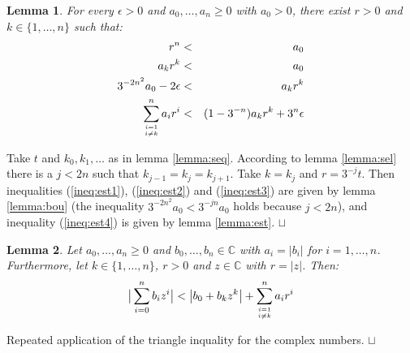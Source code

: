\documentclass{article}
\def\CC{\mathbb{C}}
\newtheorem{lemma}{Lemma}
\newenvironment{proof}{\trivlist \item[\hskip \labelsep{\bf Proof$\,$}]}{\hfill\rlap{$\sqcap$}$\sqcup$\par}
\begin{document}
\begin{lemma}\label{lemma:est1}
For every $\epsilon > 0$ and $a_0,\ldots,a_n \ge 0$ with $a_0 > 0$, there
exist $r > 0$ and $k\in\{1,\ldots,n\}$ such that:
\begin{eqnarray}
r^n &<& a_0 \label{ineq:est1}\\
a_k r^k &<& a_0 \label{ineq:est2}\\
3^{-2n^2} a_0 - 2\epsilon &<& a_k r^k \label{ineq:est3}\\
\sum_{i=1\atop i\ne k}^n a_i r^i &<& (1 - 3^{-n}) a_k r^k + 3^n\epsilon \label{ineq:est4}
\end{eqnarray}
\end{lemma}
\begin{proof}
Take $t$ and $k_0, k_1, \ldots$ as in lemma \ref{lemma:seq}.  According to
lemma \ref{lemma:sel} there is a $j < 2n$ such that $k_{j-1} = k_j = k_{j+1}$.
Take $k = k_j$ and $r = 3^{-j} t$.  Then inequalities (\ref{ineq:est1}), (\ref{ineq:est2}) and
(\ref{ineq:est3}) are given by lemma \ref{lemma:bou}
(the inequality $3^{-2n^2} a_0 < 3^{-jn} a_0$ holds because $j < 2n$),
and inequality (\ref{ineq:est4}) is given by lemma \ref{lemma:est}.
\end{proof}

\begin{lemma}\label{lemma:est2}
Let $a_0,\ldots,a_n\ge 0$ and $b_0,\ldots,b_n\in\CC$ with $a_i = |b_i|$ for
$i=1,\ldots,n$.
Furthermore, let $k\in\{1,\ldots,n\}$, $r > 0$ and  $z\in\CC$ with $r = |z|$.  Then:
$$\big|\sum_{i=0}^n b_i z^i\big| < \left|b_0 + b_k z^k\right| + \sum_{i=1\atop i\ne k}^n a_i r^i$$
\end{lemma}
\begin{proof}
Repeated application of the triangle inquality for the complex numbers.
\end{proof}
\end{document}

